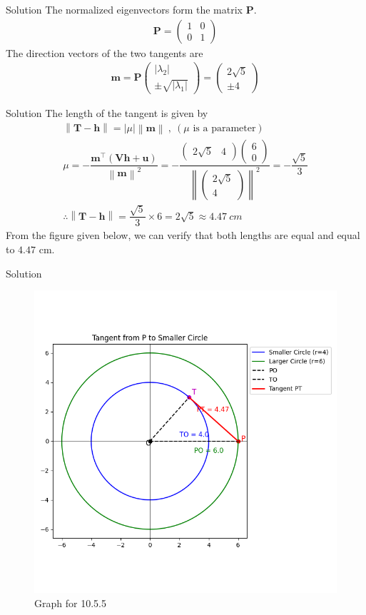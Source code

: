 \documentclass{beamer}
\let\vec\mathbf
\providecommand{\brak}[1]{\ensuremath{\left(#1\right)}}
\theoremstyle{remark}
\providecommand{\norm}[1]{\left\lVert#1\right\rVert}
\providecommand{\abs}[1]{\left\vert#1\right\vert}
\newcommand{\myvec}[1]{\ensuremath{\begin{pmatrix}#1\end{pmatrix}}}
\begin{document}
    \begin{frame}{Solution}
        The normalized eigenvectors form the matrix $\vec{P}$.
\begin{align}
    \vec{P}=\myvec{1 & 0\\0&1}
\end{align}
The direction vectors of the two tangents are
\begin{align}
    \vec{m}=\vec{P}\myvec{\abs{\lambda_2} \\ \pm\sqrt{\abs{\lambda_1}}}=\myvec{2\sqrt{5} \\ \pm 4}
\end{align}
    \end{frame}
    \begin{frame}{Solution}
        The length of the tangent is given by
\begin{align}
    \norm{\vec{T}-\vec{h}}=\abs{\mu} \norm{\vec{m}} \ , \ \brak{\text{$\mu$ is a parameter}}\\
    \mu= -\dfrac{\vec{m}^{\top} \brak{\vec{V}\vec{h} + \vec{u}}}{\norm{\vec{m}}^2} =-\dfrac{\myvec{2\sqrt{5} & 4} \myvec{6\\0}}{\norm{\myvec{2\sqrt{5} \\ 4}}^2}=-\dfrac{\sqrt{5}}{3}\\
    \therefore \norm{\vec{T}-\vec{h}}=\dfrac{\sqrt{5}}{3} \times 6 = 2\sqrt{5} \approx 4.47 \ cm
\end{align}
From the figure given below, we can verify that both lengths are equal and equal to $4.47$ cm.
    \end{frame}
    \begin{frame}{Solution}
    
    \begin{figure}
    \centering
    \includegraphics[width=0.6\columnwidth]{figs/1.png}
    \caption{Graph for 10.5.5}
    \label{fig:placeholder}
\end{figure}
    \end{frame}
    
    
    
\end{document}
